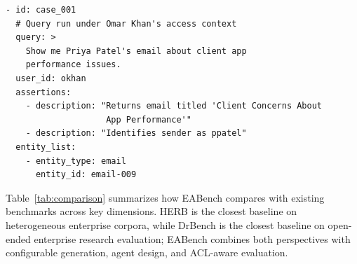 \documentclass[10pt,twocolumn]{article}
\begin{document}
\begin{lstlisting}[caption={Auto-generated evaluation case (TechNova tenant, \texttt{eval\_dataset.yaml}).},label={lst:eval_case}]
- id: case_001
  # Query run under Omar Khan's access context
  query: >
    Show me Priya Patel's email about client app
    performance issues.
  user_id: okhan
  assertions:
    - description: "Returns email titled 'Client Concerns About
                    App Performance'"
    - description: "Identifies sender as ppatel"
  entity_list:
    - entity_type: email
      entity_id: email-009
\end{lstlisting}

Table~\ref{tab:comparison} summarizes how EABench compares with existing
benchmarks across key dimensions.  HERB is the closest baseline on
heterogeneous enterprise corpora, while DrBench is the closest baseline on
open-ended enterprise research evaluation; EABench combines both perspectives
with configurable generation, agent design, and ACL-aware evaluation.
\end{document}
